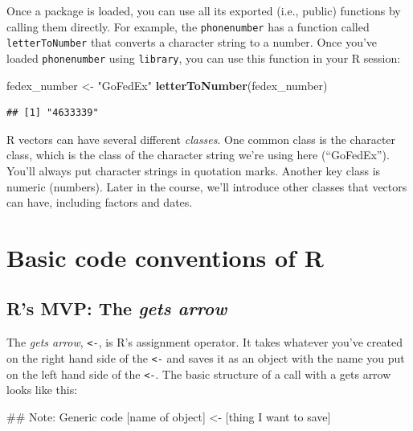 \documentclass[]{book}
\makeatletter
\newenvironment{Shaded}{\begin{snugshade}}{\end{snugshade}}
\newcommand{\KeywordTok}[1]{\textcolor[rgb]{0.13,0.29,0.53}{\textbf{{#1}}}}
\newcommand{\StringTok}[1]{\textcolor[rgb]{0.31,0.60,0.02}{{#1}}}
\newcommand{\NormalTok}[1]{{#1}}
\newenvironment{kframe}{%
\medskip{}
\setlength{\fboxsep}{.8em}
 \def\at@end@of@kframe{}%
 \ifinner\ifhmode%
  \def\at@end@of@kframe{\end{minipage}}%
  \begin{minipage}{\columnwidth}%
 \fi\fi%
 \def\FrameCommand##1{\hskip\@totalleftmargin \hskip-\fboxsep
 \colorbox{shadecolor}{##1}\hskip-\fboxsep
     \hskip-\linewidth \hskip-\@totalleftmargin \hskip\columnwidth}%
 \MakeFramed {\advance\hsize-\width
   \@totalleftmargin\z@ \linewidth\hsize
   \@setminipage}}%
 {\par\unskip\endMakeFramed%
 \at@end@of@kframe}
\renewenvironment{Shaded}{\begin{kframe}}{\end{kframe}}
\newenvironment{rmdblock}[1]
  {
  \begin{itemize}
  \renewcommand{\labelitemi}{
    \raisebox{-.7\height}[0pt][0pt]{
      {\setkeys{Gin}{width=3em,keepaspectratio}\texttt{[image: images/\#1]}}
    }
  }
  \setlength{\fboxsep}{1em}
  \begin{kframe}
  \item
  }
  {
  \end{kframe}
  \end{itemize}
  }
\newenvironment{rmdnote}
  {\begin{rmdblock}{note}}
  {\end{rmdblock}}
\makeatother
\begin{document}
Once a package is loaded, you can use all its exported (i.e., public)
functions by calling them directly. For example, the
\texttt{phonenumber} has a function called \texttt{letterToNumber} that
converts a character string to a number. Once you've loaded
\texttt{phonenumber} using \texttt{library}, you can use this function
in your R session:

\begin{Shaded}
\begin{Highlighting}[]
\NormalTok{fedex_number <-}\StringTok{ "GoFedEx"}
\KeywordTok{letterToNumber}\NormalTok{(fedex_number)}
\end{Highlighting}
\end{Shaded}

\begin{verbatim}
## [1] "4633339"
\end{verbatim}

\begin{rmdnote}
R vectors can have several different \emph{classes}. One common class is
the character class, which is the class of the character string we're
using here (``GoFedEx''). You'll always put character strings in
quotation marks. Another key class is numeric (numbers). Later in the
course, we'll introduce other classes that vectors can have, including
factors and dates.
\end{rmdnote}

\section{Basic code conventions of R}\label{basic-code-conventions-of-r}

\subsection{\texorpdfstring{R's MVP: The \emph{gets
arrow}}{R's MVP: The gets arrow}}\label{rs-mvp-the-gets-arrow}

The \emph{gets arrow}, \texttt{\textless{}-}, is R's assignment
operator. It takes whatever you've created on the right hand side of the
\texttt{\textless{}-} and saves it as an object with the name you put on
the left hand side of the \texttt{\textless{}-}. The basic structure of
a call with a gets arrow looks like this:

\begin{Shaded}
\begin{Highlighting}[]
\NormalTok{## Note: Generic code}
\NormalTok{[name of object] <-}\StringTok{ }\NormalTok{[thing I want to save]}
\end{Highlighting}
\end{Shaded}
\end{document}
